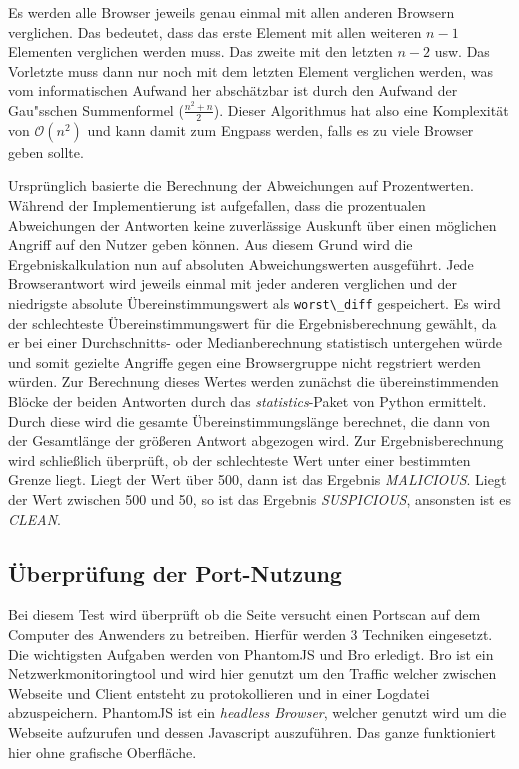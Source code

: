 Es werden alle Browser jeweils genau einmal mit allen anderen Browsern verglichen.
Das bedeutet, dass das erste Element mit allen weiteren $n-1$ Elementen verglichen werden muss. Das zweite mit den letzten $n-2$ usw.
Das Vorletzte muss dann nur noch mit dem letzten Element verglichen werden, was vom informatischen Aufwand her abschätzbar ist durch den Aufwand der Gau"sschen Summenformel ($\frac{n^2+n}{2}$).
Dieser Algorithmus hat also eine Komplexität von $\mathcal{O}(n^2)$ und kann damit zum Engpass werden, falls es zu viele Browser geben sollte.

Ursprünglich basierte die Berechnung der Abweichungen auf Prozentwerten.
Während der Implementierung ist aufgefallen, dass die prozentualen Abweichungen der Antworten keine zuverlässige Auskunft über einen möglichen Angriff auf den Nutzer geben können.
Aus diesem Grund wird die Ergebniskalkulation nun auf absoluten Abweichungswerten ausgeführt.
Jede Browserantwort wird jeweils einmal mit jeder anderen verglichen und der niedrigste absolute Übereinstimmungswert als \lstinline{worst\_diff} gespeichert.
Es wird der schlechteste Übereinstimmungswert für die Ergebnisberechnung gewählt, da er bei einer Durchschnitts- oder Medianberechnung  statistisch untergehen würde und somit gezielte Angriffe gegen eine Browsergruppe nicht regstriert werden würden.
Zur Berechnung dieses Wertes werden zunächst die übereinstimmenden Blöcke der beiden Antworten durch das \textit{statistics}-Paket von Python ermittelt.
Durch diese wird die gesamte Übereinstimmungslänge berechnet, die dann von der Gesamtlänge der größeren Antwort abgezogen wird.
Zur Ergebnisberechnung wird schließlich überprüft, ob der schlechteste Wert unter einer bestimmten Grenze liegt.
Liegt der Wert über 500, dann ist das Ergebnis \textit{MALICIOUS}.
Liegt der Wert zwischen 500 und 50, so ist das Ergebnis \textit{SUSPICIOUS}, ansonsten ist es \textit{CLEAN}.

\subsection{Überprüfung der Port-Nutzung}
Bei diesem Test wird überprüft ob die Seite versucht einen Portscan auf dem Computer des Anwenders zu betreiben. Hierfür werden 3 Techniken eingesetzt. Die wichtigsten Aufgaben werden von PhantomJS und Bro erledigt.
Bro ist ein Netzwerkmonitoringtool und wird hier genutzt um den Traffic welcher zwischen Webseite und Client entsteht zu protokollieren und in einer Logdatei abzuspeichern. PhantomJS ist ein \textit{headless Browser}, welcher genutzt wird um die Webseite aufzurufen und dessen Javascript auszuführen. Das ganze funktioniert hier ohne grafische Oberfläche.

